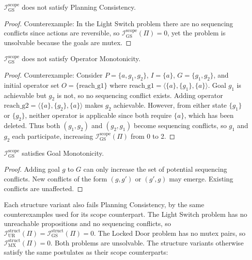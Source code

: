 \begin{prop}
    $\mathcal{I}^{\text{scope}}_{\text{GS}}$ does not satisfy Planning Consistency.
\end{prop}
\begin{proof}
    Counterexample: In the Light Switch problem there are no sequencing conflicts since actions are reversible, so $\mathcal{I}^{\text{scope}}_{\text{GS}}(\Pi) = 0$, yet the problem is unsolvable because the goals are mutex.
\end{proof}

\begin{prop}
    $\mathcal{I}^{\text{scope}}_{\text{GS}}$ does not satisfy Operator Monotonicity.
\end{prop}
\begin{proof}
    Counterexample: Consider $P = \{a, g_1, g_2\}$, $I = \{a\}$, $G = \{g_1, g_2\}$, and initial operator set $O = \{\text{reach\_g1}\}$ where $\text{reach\_g1} = \langle \{a\}, \{g_1\}, \{a\} \rangle$. Goal $g_1$ is achievable but $g_2$ is not, so no sequencing conflict exists. Adding operator $\text{reach\_g2} = \langle \{a\}, \{g_2\}, \{a\} \rangle$ makes $g_2$ achievable. However, from either state $\{g_1\}$ or $\{g_2\}$, neither operator is applicable since both require $\{a\}$, which has been deleted. Thus both $(g_1, g_2)$ and $(g_2, g_1)$ become sequencing conflicts, so $g_1$ and $g_2$ each participate, increasing $\mathcal{I}^{\text{scope}}_{\text{GS}}(\Pi)$ from 0 to 2.
\end{proof}

\begin{prop}
    $\mathcal{I}^{\text{scope}}_{\text{GS}}$ satisfies Goal Monotonicity.
\end{prop}
\begin{proof}
    Adding goal $g$ to $G$ can only increase the set of potential sequencing conflicts. New conflicts of the form $(g, g')$ or $(g', g)$ may emerge. Existing conflicts are unaffected.
\end{proof}

Each structure variant also fails Planning Consistency, by the same counterexamples used for its scope counterpart. The Light Switch problem has no unreachable propositions and no sequencing conflicts, so $\mathcal{I}^{\text{struct}}_{\text{UR}}(\Pi) = \mathcal{I}^{\text{struct}}_{\text{GS}}(\Pi) = 0$. The Locked Door problem has no mutex pairs, so $\mathcal{I}^{\text{struct}}_{\text{MX}}(\Pi) = 0$. Both problems are unsolvable. The structure variants otherwise satisfy the same postulates as their scope counterparts:

